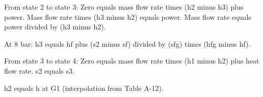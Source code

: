 From state 2 to state 3:  
Zero equals mass flow rate times (h2 minus h3) plus power.  
Mass flow rate times (h3 minus h2) equals power.  
Mass flow rate equals power divided by (h3 minus h2).  

At 8 bar:  
h3 equals hf plus (s2 minus sf) divided by (sfg) times (hfg minus hf).  

From state 3 to state 4:  
Zero equals mass flow rate times (h1 minus h2) plus heat flow rate.  
s2 equals s3.  

h2 equals h at G1 (interpolation from Table A-12).